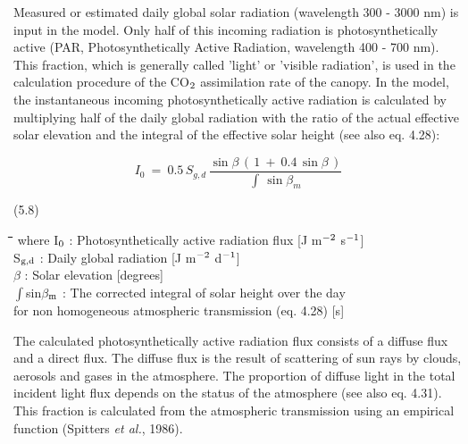 Measured or estimated daily global solar radiation  (wavelength 300 - 3000 nm) is input
in the model. Only half of this incoming radiation is photosynthetically active (PAR,
Photosynthetically Active Radiation, wavelength 400 - 700 nm). This fraction, which is
generally called 'light' or 'visible radiation', is used in the calculation procedure of the
CO$_{{\rm 2}}$ assimilation rate of the canopy. In the model, the instantaneous incoming photosyn\-thet\-ically active radiation is calculated by multiply\-ing half of the daily global radiation
with the ratio of the actual effective solar elevation and the integral of the effective solar
height (see also eq. 4.28):

\begin{displaymath}
I _{0} ~=~ 0.5\, S _{g,d} \,{\frac{\sin \beta \, (\, 1~+~0.4\, \sin \beta \, )}{\int \, \sin \beta _{m} }}
\end{displaymath}


\strut\hfill (5.8)

\nwln
\begin{tabbing}
\hspace{1.27cm}\=\hspace{1.27cm}\=\hspace{1.27cm}\=\hspace{1.27cm}\=%
\hspace{1.27cm}\=\hspace{1.27cm}\=\hspace{1.27cm}\=\hspace{1.27cm}\=%
\hspace{1.27cm}\=\hspace{1.27cm}\=\kill
where I$_{{\rm 0}}$ : Photosynthetically active radia\-tion flux        [J m$^{{\rm -2}}$ s$^{{\rm -1}}$]\\
S$_{{\rm g,d}}$ : Daily global radiation        [J m$^{{\rm -2}}$ d$^{{\rm -1}}$]\\
$\beta$ : Solar elevation        [degrees]\\
$\int$sin$\beta$$_{{\rm m}}$ : The corrected integral of solar height over the day \\
    for non homogeneous atmospheric transmission (eq. 4.28)        [s]
\end{tabbing}






The calculated photosynthetically active radiation flux consists of a diffuse flux and a
direct flux. The diffuse flux is the result of scattering of sun rays by clouds, aerosols and
gases in the atmosphere. The proportion of diffuse light in the total incident light flux
depends on the status of the atmosphere (see also eq. 4.31). This fraction is calculated
from the atmospheric transmission using an empirical function (Spitters {\it et al.\/}, 1986).

